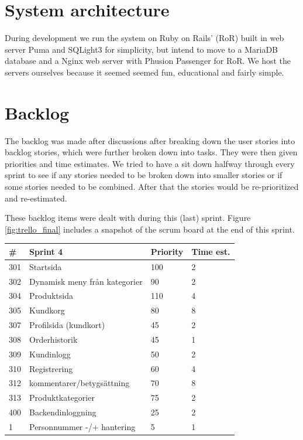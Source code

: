 \documentclass[paper=a4, fontsize=11pt]{report} %
\begin{document}
\section*{System architecture}
	During development we run the system on Ruby on Rails' (RoR) built in web server
	Puma and SQLight3 for simplicity, but intend to move to a MariaDB database
	and a Nginx web server with Phusion Passenger for RoR. We host
	the servers ourselves because it seemed seemed fun, educational and fairly simple.

\section*{Backlog}

	The backlog was made after discussions after breaking down the user stories
	into backlog stories, which were further broken down into tasks. They were
	then given priorities and time estimates. We tried to have a sit down halfway
	through every sprint to see if any stories needed to be broken down into
	smaller stories or if some stories needed to be combined. After that the
	stories would be re-prioritized and re-estimated.

	These backlog items were dealt with during this (last) sprint.
	Figure \ref{fig:trello_final} includes a snapshot of the scrum board
	at the end of this sprint. \\

	\begin{tabular}{|l|l|l|l|}
		\hline
		\#  & Sprint 4                      & Priority & Time est. \\ \hline
		301 & Startsida                     & 100      & 2         \\ \hline
		302 & Dynamisk meny från kategorier & 90       & 2         \\ \hline
		304 & Produktsida                   & 110      & 4         \\ \hline
		305 & Kundkorg                      & 80       & 8         \\ \hline
		307 & Profilsida (kundkort)         & 45       & 2         \\ \hline
		308 & Orderhistorik                 & 45       & 1         \\ \hline
		309 & Kundinlogg                    & 50       & 2         \\ \hline
		310 & Registrering                  & 60       & 4         \\ \hline
		312 & kommentarer/betygsättning     & 70       & 8         \\ \hline
		313 & Produktkategorier             & 75       & 2         \\ \hline
		400 & Backendinloggning             & 25       & 2         \\ \hline
		1   & Personnummer -/+ hantering    & 5        & 1         \\ \hline
	\end{tabular} \\
\end{document}
